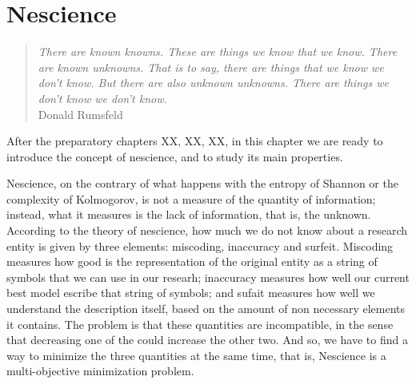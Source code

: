 %
%


%
%


\chapter{Nescience}
\label{chap:Nescience}

\begin{quote}
\begin{flushright}
\emph{There are known knowns. These are things we know that we know.
There are known unknowns. That is to say, there are things that we know we don't know.
But there are also unknown unknowns. There are things we don't know we don't know.} \\
Donald Rumsfeld
\end{flushright}
\end{quote}
\bigskip

After the preparatory chapters XX, XX, XX, in this chapter we are ready to introduce the concept of nescience, and to study its main properties.

Nescience, on the contrary of what happens with the entropy of Shannon or the complexity of Kolmogorov, is not a measure of the quantity of information; instead, what it measures is the lack of information, that is, the unknown. According to the theory of nescience, how much we do not know about a research entity is given by three elements: miscoding, inaccuracy and surfeit. Miscoding measures how good is the representation of the original entity as a string of symbols that we can use in our researh; inaccuracy measures how well our current best model escribe that string of symbols; and sufait measures how well we understand the description itself, based on the amount of non necessary elements it contains. The problem is that these quantities are incompatible, in the sense that decreasing one of the could increase the other two. And so, we have to find a way to minimize the three quantities at the same time, that is, Nescience is a multi-objective minimization problem.

